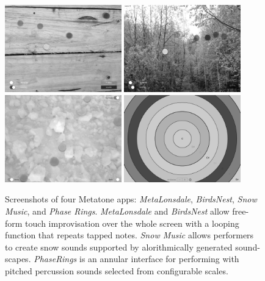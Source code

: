 \documentclass[graybox]{svmult}
\begin{document}
\begin{figure}
\begin{center}
  \includegraphics[width=0.45\textwidth]{figures/app-2-MetaLonsdale-bw}
  \includegraphics[width=0.45\textwidth]{figures/app-3-BirdsNest-bw}
  \includegraphics[width=0.45\textwidth]{figures/app-4-SnowMusic-bw}
  \includegraphics[width=0.45\textwidth]{figures/app-5-PhaseRings-bw}
\end{center}
\caption{Screenshots of four Metatone apps: \emph{MetaLonsdale},
  \emph{BirdsNest}, \emph{Snow Music}, and \emph{Phase Rings}.
  \emph{MetaLonsdale} and \emph{BirdsNest} allow free-form touch
  improvisation over the whole screen with a looping function that
  repeats tapped notes. \emph{Snow Music} allows performers to create
  snow sounds supported by alorithmically generated sound-scapes.
  \emph{PhaseRings} is an annular interface for performing with
  pitched percussion sounds selected from configurable scales.}
\label{fig:metatone-apps}
\end{figure}
\end{document}
